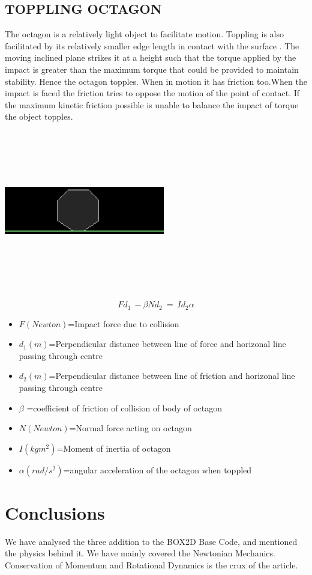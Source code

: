 \documentclass[11 pt]{article}
\begin{document}
\subsection{TOPPLING OCTAGON}
The octagon is a relatively light object to facilitate motion. Toppling is also facilitated by its relatively smaller edge length in contact with the surface \cite{hcv}. The moving inclined plane strikes it at a height such that the torque applied by the impact is greater than the maximum torque that could be provided to maintain stability\cite{hrk}. Hence the octagon topples. When in motion it has friction too.When the impact is faced the friction tries to oppose the motion of the point of contact. If the maximum kinetic friction possible is unable to balance the impact of torque the object topples.\cite{hrk}
\begin{center}\includegraphics[width=7cm, height=7cm]{octagon.eps}\end{center}
\begin{equation}F d_{1} \: - \beta N d_{2}\:= \:Id_{2} \alpha \end{equation}
\begin{itemize}
\item $F(Newton)$=Impact force due to collision 
\item $d_{1}(m)$=Perpendicular distance between line of force and horizonal line passing through centre 
\item $d_{2}(m)$=Perpendicular distance between line of friction and horizonal line passing through centre 
\item $\beta$ =coefficient of friction of collision of body of octagon
\item $N(Newton)$=Normal force acting on octagon 
\item $I(kgm^{2})$=Moment of inertia of octagon 
\item $\alpha(rad/s^{2})$=angular acceleration of the octagon when toppled 
\end{itemize}

\section{Conclusions}
We have analysed the three addition to the BOX2D Base Code, and mentioned the physics behind it. We have mainly covered the Newtonian Mechanics. Conservation of Momentum and Rotational Dynamics is the crux of the article.




  
\end{document}
